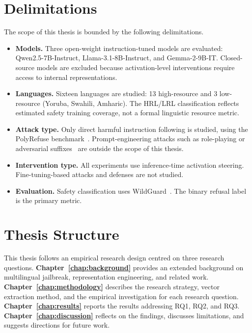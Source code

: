 \section{Delimitations}
\label{sec:delimitations}

The scope of this thesis is bounded by the following delimitations.

\begin{itemize}[noitemsep]
    \item \textbf{Models.} Three open-weight instruction-tuned models are evaluated: Qwen2.5-7B-Instruct, Llama-3.1-8B-Instruct, and Gemma-2-9B-IT. Closed-source models are excluded because activation-level interventions require access to internal representations.

    \item \textbf{Languages.} Sixteen languages are studied: 13 high-resource and 3 low-resource (Yoruba, Swahili, Amharic). The HRL/LRL classification reflects estimated safety training coverage, not a formal linguistic resource metric.

    \item \textbf{Attack type.} Only direct harmful instruction following is studied, using the PolyRefuse benchmark~\citep{wang2026refusal}. Prompt-engineering attacks such as role-playing or adversarial suffixes~\citep{zou2023universal} are outside the scope of this thesis.

    \item \textbf{Intervention type.} All experiments use inference-time activation steering. Fine-tuning-based attacks and defenses are not studied.

    \item \textbf{Evaluation.} Safety classification uses WildGuard~\citep{han2024wildguard}. The binary refusal label is the primary metric.
\end{itemize}

\section{Thesis Structure}
\label{sec:structure}

This thesis follows an empirical research design centred on three research questions. \textbf{Chapter~\ref{chap:background}} provides an extended background on multilingual jailbreak, representation engineering, and related work. \textbf{Chapter~\ref{chap:methodology}} describes the research strategy, vector extraction method, and the empirical investigation for each research question. \textbf{Chapter~\ref{chap:results}} reports the results addressing RQ1, RQ2, and RQ3. \textbf{Chapter~\ref{chap:discussion}} reflects on the findings, discusses limitations, and suggests directions for future work.
